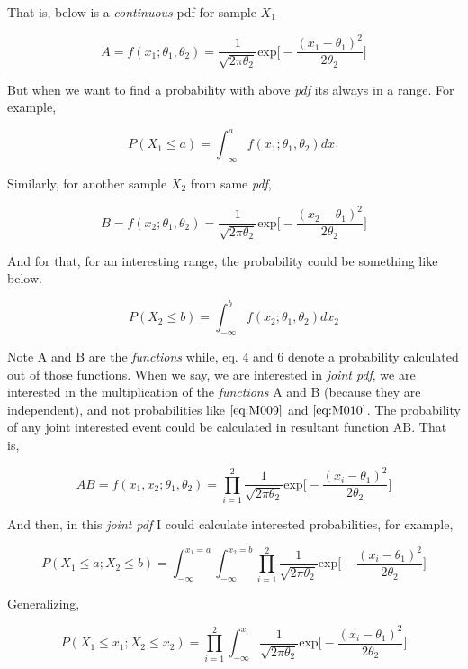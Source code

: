 \documentclass[float=false,crop=false]{standalone}
\begin{document}
That is, below is a \emph{continuous} pdf for sample \(X_1\)

\[
A = f(x_1; \theta_1, \theta_2) = \dfrac{1}{\sqrt{2\pi\theta_2}}{\text{exp}}{\Big[ -\dfrac{  (x_1-\theta_1)^2 }{2\theta_2}}\Big]  
\]

But when we want to find a probability with above \emph{pdf} its always
in a range. For example,

\begin{equation}
P(X_1 \leq a) = \int_{-\infty}^{a} f(x_1; \theta_1, \theta_2)dx_1 \label{eq:M009}
\end{equation}

Similarly, for another sample \(X_2\) from same \emph{pdf},

\[
B = f(x_2; \theta_1, \theta_2) = \dfrac{1}{\sqrt{2\pi\theta_2}}{\text{exp}}{\Big[ -\dfrac{  (x_2-\theta_1)^2 }{2\theta_2}}\Big] 
\]

And for that, for an interesting range, the probability could be
something like below.

\begin{equation}
P(X_2 \leq b) = \int_{-\infty}^{b} f(x_2; \theta_1, \theta_2)dx_2 \label{eq:M010}
\end{equation}

Note A and B are the \emph{functions} while, eq. \(4\) and \(6\) denote
a probability calculated out of those functions. When we say, we are
interested in \emph{joint pdf}, we are interested in the multiplication
of the \emph{functions} A and B (because they are independent), and not
probabilities like \(\ref{eq:M009}\) and \(\ref{eq:M010}\). The
probability of any joint interested event could be calculated in
resultant function AB. That is,

\[
AB = f(x_1,x_2;\theta_1,\theta_2) = \prod\limits_{i=1}^{2} \dfrac{1}{\sqrt{2\pi\theta_2}}{\text{exp}}{\Big[ -\dfrac{  (x_i-\theta_1)^2 }{2\theta_2}}\Big] 
\]

And then, in this \emph{joint pdf} I could calculate interested
probabilities, for example,

\[
P(X_1 \leq a; X_2 \leq b) = \int_{-\infty}^{x_1=a}\int_{-\infty}^{x_2=b} \prod\limits_{i=1}^{2} \dfrac{1}{\sqrt{2\pi\theta_2}}{\text{exp}}{\Big[ -\dfrac{  (x_i-\theta_1)^2 }{2\theta_2}}\Big]
\]

Generalizing,

\[
P(X_1 \leq x_1; X_2 \leq x_2) = \prod\limits_{i=1}^{2} \int_{-\infty}^{x_i} \dfrac{1}{\sqrt{2\pi\theta_2}}{\text{exp}}{\Big[ -\dfrac{  (x_i-\theta_1)^2 }{2\theta_2}}\Big] 
\]
\end{document}
